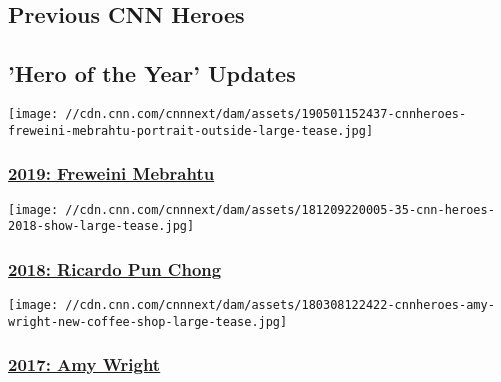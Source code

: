 \hypertarget{previous-cnn-heroes-}{%
\subsection{Previous CNN Heroes~}\label{previous-cnn-heroes-}}

\hypertarget{hero-of-the-year-updates}{%
\subsection{'Hero of the Year' Updates}\label{hero-of-the-year-updates}}

\href{https://www.cnn.com/videos/world/2020/02/27/cnnheroes-freweini-upd.cnn}{}

\texttt{[image: //cdn.cnn.com/cnnnext/dam/assets/190501152437-cnnheroes-freweini-mebrahtu-portrait-outside-large-tease.jpg]}

\hypertarget{2019-freweini-mebrahtu}{%
\subsubsection{\texorpdfstring{\href{https://www.cnn.com/videos/world/2020/02/27/cnnheroes-freweini-upd.cnn}{2019:
Freweini
Mebrahtu}}{2019: Freweini Mebrahtu}}\label{2019-freweini-mebrahtu}}

\href{http://www.cnn.com/video/data/2.0/video/world/2019/05/16/cnnheroes-pun-chong-update-mixed.cnn.html}{}

\texttt{[image: //cdn.cnn.com/cnnnext/dam/assets/181209220005-35-cnn-heroes-2018-show-large-tease.jpg]}

\hypertarget{2018-ricardo-pun-chong}{%
\subsubsection{\texorpdfstring{\href{http://www.cnn.com/video/data/2.0/video/world/2019/05/16/cnnheroes-pun-chong-update-mixed.cnn.html}{2018:
Ricardo Pun
Chong}}{2018: Ricardo Pun Chong}}\label{2018-ricardo-pun-chong}}

\href{https://www.cnn.com/videos/us/2018/03/08/cnnheroes-wright-update-orig.cnn}{}

\texttt{[image: //cdn.cnn.com/cnnnext/dam/assets/180308122422-cnnheroes-amy-wright-new-coffee-shop-large-tease.jpg]}

\hypertarget{2017-amy-wright}{%
\subsubsection{\texorpdfstring{\href{https://www.cnn.com/videos/us/2018/03/08/cnnheroes-wright-update-orig.cnn}{2017:
Amy Wright}}{2017: Amy Wright}}\label{2017-amy-wright}}

